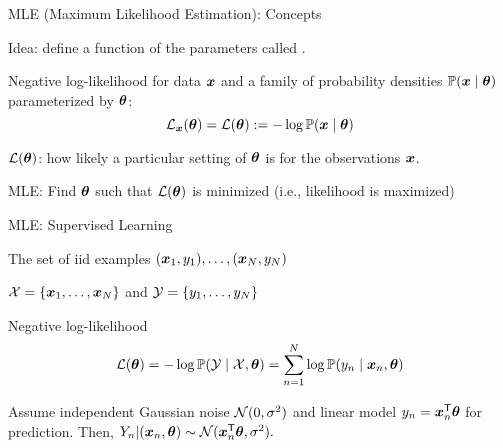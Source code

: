 \documentclass[handout,fleqn,aspectratio=169]{beamer}
\begin{document}
\begin{frame}{MLE (Maximum Likelihood Estimation): Concepts}

\plitemsep 0.07in

\bci 

\item Idea: define a function of the parameters called .

\item Negative log-likelihood for data $\bm{x}$ and a family of probability densities $\mathbb{P}( \bm{x} \mid \bm{\theta} )$ parameterized by $\bm{\theta}$:
$$
{\cal L}_{\bm{x}}(\bm{\theta}) = {\cal L}(\bm{\theta}) := - \log \mathbb{P}( \bm{x} \mid \bm{\theta} )
$$
\bci
\item ${\cal L}(\bm{\theta})$: how likely a particular setting of $\bm{\theta}$ is for the observations $\bm{x}$.
\eci

\bigskip
\item MLE: Find $\bm{\theta}$ such that ${\cal L}(\bm{\theta})$ is minimized (i.e., likelihood is maximized)
\eci
\end{frame}

\begin{frame}{MLE: Supervised Learning}

\plitemsep 0.05in

\bci 

\item The set of iid examples $(\bm{x}_1, y_1), \ldots, (\bm{x}_N,y_N)$

\item $\mathcal X = \{\bm{x}_1, \ldots, \bm{x}_N \}$ and $\mathcal Y = \{y_1, \ldots, y_N \}$

\item Negative log-likelihood
$$
{\cal L}(\bm{\theta}) = - \log \mathbb{P}( \mathcal Y \mid \mathcal X, \bm{\theta} ) = \sum_{n=1}^N \log \mathbb{P}( y_n \mid \bm{x}_n, \bm{\theta} )
$$

\item \exam Assume independent Gaussian noise $\mathcal N(0,\sigma^2)$ and linear model $y_n = {\bm{x}}^{\mathsf{T}}_n \bm{\theta}$ for prediction. Then, $Y_n| (\bm{x}_n,\bm{\theta}) \sim \mathcal N({\bm{x}}^{\mathsf{T}}_n\bm{\theta}, \sigma^2).$
{\small
{}}

\eci
\end{frame}
\end{document}

